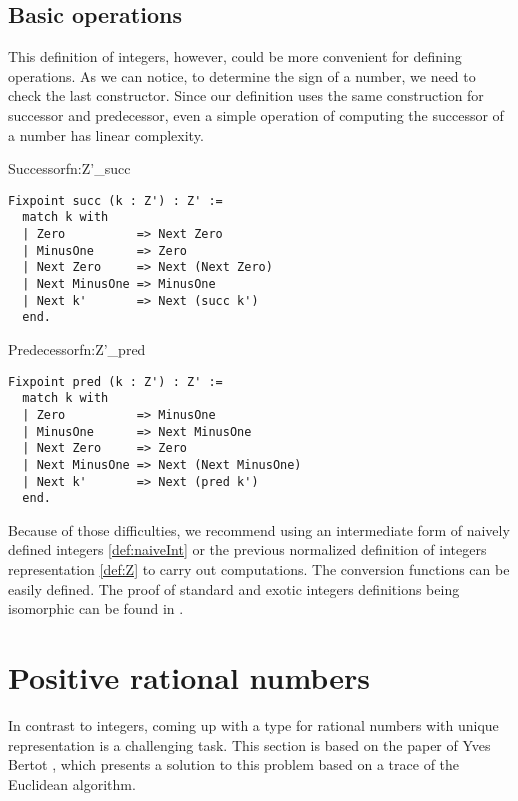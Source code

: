 \subsection{Basic operations}
This definition of integers, however, could be more convenient for defining operations. As we can notice, to determine the sign of a number, we need to check the last constructor. Since our definition uses the same construction for successor and predecessor, even a simple operation of computing the successor of a number has linear complexity.
\begin{func}[D]{Successor}{fn:Z'_succ}
\begin{verbatim}
Fixpoint succ (k : Z') : Z' :=
  match k with
  | Zero          => Next Zero
  | MinusOne      => Zero
  | Next Zero     => Next (Next Zero)
  | Next MinusOne => MinusOne
  | Next k'       => Next (succ k')
  end.
\end{verbatim}
\end{func}
\begin{func}{Predecessor}{fn:Z'_pred}
\begin{verbatim}
Fixpoint pred (k : Z') : Z' :=
  match k with
  | Zero          => MinusOne
  | MinusOne      => Next MinusOne
  | Next Zero     => Zero
  | Next MinusOne => Next (Next MinusOne)
  | Next k'       => Next (pred k')
  end.
\end{verbatim}
\end{func}
Because of those difficulties, we recommend using an intermediate form of naively defined integers \ref{def:naiveInt} or the previous normalized definition of integers representation \ref{def:Z} to carry out computations. The conversion functions can be easily defined. The proof of standard and exotic integers definitions being isomorphic can be found in .
\section{Positive rational numbers}
In contrast to integers, coming up with a type for rational numbers with unique representation is a challenging task. This section is based on the paper of Yves Bertot \cite{Qplus}, which presents a solution to this problem based on a trace of the Euclidean algorithm.
